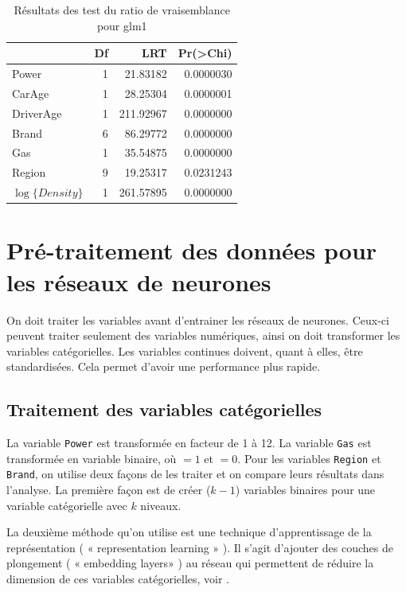 \begin{table}
\centering
\caption{\label{tab:LRTglm1} Résultats des test du ratio de vraisemblance pour glm1}
\begin{tabular}{lrrr}
\toprule
  & Df & LRT & Pr(>Chi)\\
\midrule
Power & 1 & 21.83182 & 0.0000030\\
CarAge & 1 & 28.25304 & 0.0000001\\
DriverAge & 1 & 211.92967 & 0.0000000\\
Brand & 6 & 86.29772 & 0.0000000\\
Gas & 1 & 35.54875 & 0.0000000\\
\addlinespace
Region & 9 & 19.25317 & 0.0231243\\
$\log\{Density\}$ & 1 & 261.57895 & 0.0000000\\
\bottomrule
\end{tabular}
\end{table}



\section{Pré-traitement des données pour les réseaux de neurones}
\label{sec:app:pretraitement}

On doit traiter les variables avant d'entrainer les réseaux de neurones. Ceux-ci peuvent traiter seulement des variables numériques, ainsi on doit transformer les variables catégorielles. Les variables continues doivent, quant à elles, être standardisées. Cela permet d'avoir une performance plus rapide. %

\subsection{Traitement des variables catégorielles}

La variable \verb=Power= est transformée en facteur de 1 à 12. La variable \verb=Gas= est transformée en variable binaire, où \Verb@Regular@ $=1$ et \Verb@Diesel@ $=0$. Pour les variables \verb=Region= et \verb=Brand=, on utilise deux façons de les traiter et on compare leurs résultats dans l'analyse. La première façon est de créer ($k-1$) variables binaires pour une variable catégorielle avec $k$ niveaux. 

La deuxième méthode qu'on utilise est une technique d'apprentissage de la représentation ( « representation learning » ). Il s'agit d'ajouter des couches de plongement ( « embedding layers» ) au réseau qui permettent de réduire la dimension de ces variables catégorielles, voir \citet{richman2018ai}.



